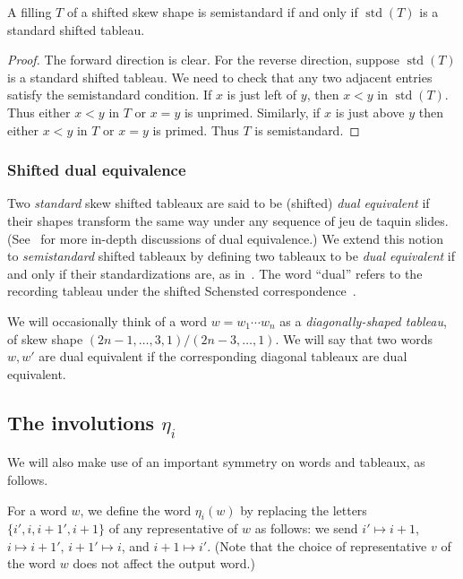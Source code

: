 \documentclass[ALCO,ThmDefs,Unicode,epreuves]{cedram}
\DeclareMathOperator{\std}{std}
\newcommand{\defn}[1]{\emph{#1}}
\begin{document}
\begin{prop}\label{prop:standardization}
A filling $T$ of a shifted skew shape is semistandard if and only if $\std(T)$ is a standard shifted tableau.
\end{prop}

\begin{proof}
The forward direction is clear. For the reverse direction, suppose $\std(T)$ is a standard shifted tableau. We need to check that any two adjacent entries satisfy the semistandard condition. If $x$ is just left of $y$, then $x<y$ in $\std(T)$. Thus either $x<y$ in $T$ or $x=y$ is unprimed. Similarly, if $x$ is just above $y$ then either $x<y$ in $T$ or $x=y$ is primed. Thus $T$ is semistandard.
\end{proof}

\subsubsection{Shifted dual equivalence}

Two \emph{standard} skew shifted tableaux are said to be (shifted) \emph{dual equivalent} if their shapes transform the same way under any sequence of jeu de taquin slides. (See~\cite{Assaf,Haiman} for more in-depth discussions of dual equivalence.) We extend this notion to \emph{semistandard} shifted tableaux by defining two tableaux to be \emph{dual equivalent} if and only if their standardizations are, as in~\cite{SaganBook}. The word ``dual'' refers to the recording tableau under the shifted Schensted correspondence~\cite{Sagan, Worley}. 

We will occasionally think of a word $w = w_1 \cdots w_n$ as a \defn{diagonally-shaped tableau}, \ie of skew shape $(2n-1, \ldots,3, 1) / (2n-3, \ldots, 1)$. We will say that two words $w, w'$ are dual equivalent if the corresponding diagonal tableaux are dual equivalent.

\subsection{The involutions \texorpdfstring{$\eta_i$}{eta i}}

We will also make use of an important symmetry on words and tableaux, as follows.

\begin{defi}
For a word $w$, we define the word $\eta_i(w)$ by replacing the letters $\{i',i,i{+}1', i{+}1\}$ of any representative of $w$ as follows: we send $i' \mapsto i{+}1$, $i \mapsto i{+}1'$, $i{+}1' \mapsto i$, and $i{+}1 \mapsto i'$. (Note that the choice of representative $v$ of the word $w$ does not affect the output word.)
\end{defi}
\end{document}
